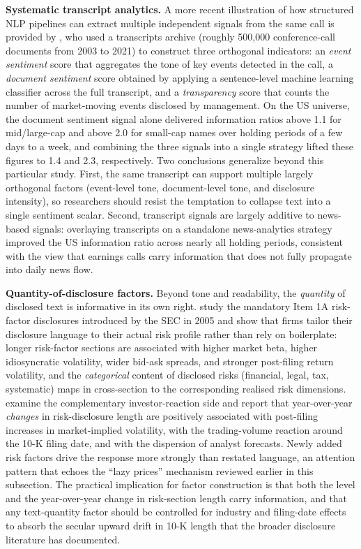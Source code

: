 \textbf{Systematic transcript analytics.} A more recent illustration of how structured NLP pipelines can extract multiple independent signals from the same call is provided by \cite{hafez2021transcripts}, who used a transcripts archive (roughly 500,000 conference-call documents from 2003 to 2021) to construct three orthogonal indicators: an \textit{event sentiment} score that aggregates the tone of key events detected in the call, a \textit{document sentiment} score obtained by applying a sentence-level machine learning classifier across the full transcript, and a \textit{transparency} score that counts the number of market-moving events disclosed by management. On the US universe, the document sentiment signal alone delivered information ratios above 1.1 for mid/large-cap and above 2.0 for small-cap names over holding periods of a few days to a week, and combining the three signals into a single strategy lifted these figures to 1.4 and 2.3, respectively. Two conclusions generalize beyond this particular study. First, the same transcript can support multiple largely orthogonal factors (event-level tone, document-level tone, and disclosure intensity), so researchers should resist the temptation to collapse text into a single sentiment scalar. Second, transcript signals are largely additive to news-based signals: overlaying transcripts on a standalone news-analytics strategy improved the US information ratio across nearly all holding periods, consistent with the view that earnings calls carry information that does not fully propagate into daily news flow.

\textbf{Quantity-of-disclosure factors.} Beyond tone and readability, the \textit{quantity} of disclosed text is informative in its own right. \cite{campbell2014information} study the mandatory Item 1A risk-factor disclosures introduced by the SEC in 2005 and show that firms tailor their disclosure language to their actual risk profile rather than rely on boilerplate: longer risk-factor sections are associated with higher market beta, higher idiosyncratic volatility, wider bid-ask spreads, and stronger post-filing return volatility, and the \textit{categorical} content of disclosed risks (financial, legal, tax, systematic) maps in cross-section to the corresponding realised risk dimensions. \cite{kravet2013textual} examine the complementary investor-reaction side and report that year-over-year \textit{changes} in risk-disclosure length are positively associated with post-filing increases in market-implied volatility, with the trading-volume reaction around the 10-K filing date, and with the dispersion of analyst forecasts. Newly added risk factors drive the response more strongly than restated language, an attention pattern that echoes the \cite{cohen2020lazy} ``lazy prices'' mechanism reviewed earlier in this subsection. The practical implication for factor construction is that both the level and the year-over-year change in risk-section length carry information, and that any text-quantity factor should be controlled for industry and filing-date effects to absorb the secular upward drift in 10-K length that the broader disclosure literature has documented.

